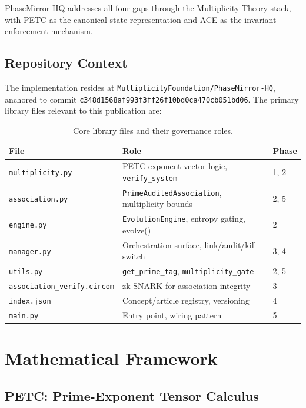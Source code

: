 \documentclass[12pt,letterpaper]{article}
\theoremstyle{definition}
\theoremstyle{remark}
\begin{document}
PhaseMirror-HQ addresses all four gaps through the Multiplicity Theory stack, with PETC
as the canonical state representation and ACE as the invariant-enforcement mechanism.

\subsection{Repository Context}

The implementation resides at \texttt{MultiplicityFoundation/PhaseMirror-HQ},
anchored to commit \texttt{c348d1568af993f3ff26f10bd0ca470cb051bd06}. The primary
library files relevant to this publication are:

\begin{table}[H]
\centering
\small
\begin{tabular}{@{}lll@{}}
\toprule
\textbf{File} & \textbf{Role} & \textbf{Phase} \\
\midrule
\texttt{multiplicity.py} & PETC exponent vector logic, \texttt{verify\_system} & 1, 2 \\
\texttt{association.py} & \texttt{PrimeAuditedAssociation}, multiplicity bounds & 2, 5 \\
\texttt{engine.py} & \texttt{EvolutionEngine}, entropy gating, evolve() & 2 \\
\texttt{manager.py} & Orchestration surface, link/audit/kill-switch & 3, 4 \\
\texttt{utils.py} & \texttt{get\_prime\_tag}, \texttt{multiplicity\_gate} & 2, 5 \\
\texttt{association\_verify.circom} & zk-SNARK for association integrity & 3 \\
\texttt{index.json} & Concept/article registry, versioning & 4 \\
\texttt{main.py} & Entry point, wiring pattern & 5 \\
\bottomrule
\end{tabular}
\caption{Core library files and their governance roles.}
\end{table}

\newpage

\section{Mathematical Framework}

\subsection{PETC: Prime-Exponent Tensor Calculus}
\end{document}

